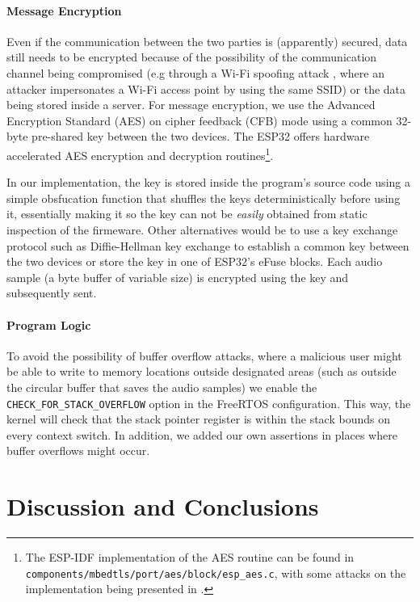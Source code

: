 \documentclass[conference]{IEEEtran}
\begin{document}
\paragraph{Message Encryption}

Even if the communication between the two parties is (apparently) secured, data still needs to be encrypted because of the possibility 
of the communication channel being compromised (e.g through a Wi-Fi spoofing attack \cite{WifiSpoofing}, where an attacker 
impersonates a Wi-Fi access point by using the same SSID) or the data being stored inside a server.
For message encryption, we use the Advanced Encryption Standard (AES) on cipher feedback (CFB) mode using 
a common 32-byte pre-shared key between the two devices.
The ESP32 offers hardware accelerated AES encryption and decryption routines\footnote{The ESP-IDF implementation of the AES routine can be found in \texttt{components/mbedtls/port/aes/block/esp\_aes.c},
with some attacks on the implementation being presented in \cite{PwnEsp32Crypto}.}.

In our implementation, the key is stored inside the program's source code using 
a simple obsfucation function that shuffles the keys deterministically before using it, essentially
making it so the key can not be \textit{easily} obtained from static inspection of the firmeware.
Other alternatives would be to use a key exchange protocol such as Diffie-Hellman key exchange\cite{DiffieHellmanKeyExchange} to 
establish a common key between the two devices or store the key in one of ESP32's eFuse blocks.
Each audio sample (a byte buffer of variable size) is encrypted using the key 
and subsequently sent.

\paragraph{Program Logic}

To avoid the possibility of buffer overflow attacks, where a malicious user might be able 
to write to memory locations outside designated areas (such as outside the circular buffer that saves
the audio samples) we enable the \texttt{CHECK\_FOR\_STACK\_OVERFLOW} option in the FreeRTOS configuration.
This way, the kernel will check that the stack pointer register is within the stack bounds on every context switch.
In addition, we added our own assertions in places where buffer overflows might occur.


\section{Discussion and Conclusions}
\label{sec:discussion_and_conclusions}
\end{document}
